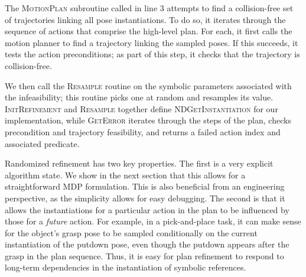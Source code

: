 The \textsc{MotionPlan} subroutine called in line 3 attempts to
find a collision-free set of trajectories linking all pose instantiations.
To do so, it iterates through the sequence of actions that comprise the high-level plan.
For each, it first calls the motion planner to find a trajectory
linking the sampled poses. If this succeeds, it tests the action preconditions;
as part of this step, it checks that the trajectory is collision-free.

We then call the \textsc{Resample} routine on the symbolic parameters
associated with the infeasibility; this routine picks one at random and
resamples its value. \textsc{InitRefinement} and \textsc{Resample} together define
\textsc{NDGetInstantiation} for our implementation, while \textsc{GetError} iterates
through the steps of the plan, checks precondition and trajectory feasibility, and returns
a failed action index and associated predicate. 

Randomized refinement has two key properties. The first is a very explicit algorithm state.
We show in the next section that this allows for a straightforward MDP
formulation. This is also beneficial from an
engineering perspective, as the simplicity allows for easy debugging. The second is that
it allows the instantiations for a particular action in
the plan to be influenced by those for a \emph{future} action. For example, in a
pick-and-place task, it can make sense for the object's grasp pose to be sampled
conditionally on the current instantiation of the putdown pose, even though the putdown
appears after the grasp in the plan sequence. Thus, it is easy for plan refinement to
respond to long-term dependencies in the instantiation of symbolic references.
